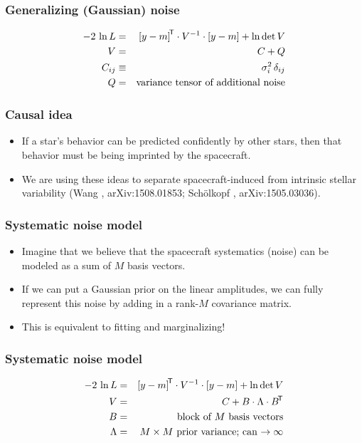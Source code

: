 \documentclass[pdftex]{beamer}
\begin{document}
\begin{frame}
  \frametitle{Generalizing (Gaussian) noise}
  \begin{eqnarray}
    -2\,\ln L &=& {[y - m]}^{\mathsf{\!T}}\cdot V^{-1}\cdot [y - m] + \ln\det V
    \nonumber \\
    V &=& C + Q
    \nonumber \\
    C_{ij} &\equiv& \sigma_i^2\,\delta_{ij}
    \nonumber \\
    Q &=& \mbox{variance tensor of additional noise}
    \nonumber
  \end{eqnarray}
\end{frame}

\begin{frame}
  \frametitle{Causal idea}
  \begin{itemize}
  \item If a star's behavior can be predicted confidently by
    other stars, then that behavior must be being imprinted by
    the spacecraft.
  \item We are using these ideas to separate spacecraft-induced from
    intrinsic stellar variability {\footnotesize (Wang \etal, arXiv:1508.01853;
    Sch\"olkopf \etal, arXiv:1505.03036)}.
  \end{itemize}
\end{frame}

\begin{frame}
  \frametitle{Systematic noise model}
  \begin{itemize}
  \item Imagine that we believe that the spacecraft systematics
    (noise) can be modeled as a sum of $M$ basis vectors.
  \item If we can put a Gaussian prior on the linear amplitudes, we
    can fully represent this noise by adding in a rank-$M$ covariance
    matrix.
  \item This is equivalent to fitting and marginalizing!
  \end{itemize}
\end{frame}

\begin{frame}
  \frametitle{Systematic noise model}
  \begin{eqnarray}
    -2\,\ln L &=& {[y - m]}^{\mathsf{\!T}}\cdot V^{-1}\cdot [y - m] + \ln\det V
    \nonumber \\
    V &=& C + B\cdot\Lambda\cdot{B}^{\mathsf{\!T}}
    \nonumber \\
    B &=& \mbox{block of $M$ basis vectors}
    \nonumber \\
    \Lambda &=& \mbox{$M\times M$ prior variance; can $\rightarrow\infty$}
    \nonumber
  \end{eqnarray}
\end{frame}
\end{document}
